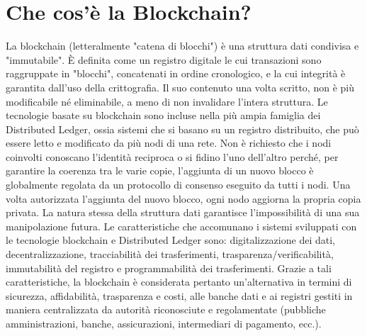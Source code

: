 \section{Che cos'è la Blockchain?}
La blockchain \cite{blockchain} (letteralmente "catena di blocchi") è una struttura dati condivisa e "immutabile". È definita come un registro digitale le cui transazioni sono raggruppate in "blocchi", concatenati in ordine cronologico, e la cui integrità è garantita dall'uso della crittografia. Il suo contenuto una volta scritto, non è più modificabile né eliminabile, a meno di non invalidare l'intera struttura. Le tecnologie basate su blockchain sono incluse nella più ampia famiglia dei Distributed Ledger, ossia sistemi che si basano su un registro distribuito, che può essere letto e modificato da più nodi di una rete. Non è richiesto che i nodi coinvolti conoscano l'identità reciproca o si fidino l'uno dell'altro perché, per garantire la coerenza tra le varie copie, l'aggiunta di un nuovo blocco è globalmente regolata da un protocollo di consenso eseguito da tutti i nodi. Una volta autorizzata l'aggiunta del nuovo blocco, ogni nodo aggiorna la propria copia privata. La natura stessa della struttura dati garantisce l'impossibilità di una sua manipolazione futura. Le caratteristiche che accomunano i sistemi sviluppati con le tecnologie blockchain e Distributed Ledger sono: digitalizzazione dei dati, decentralizzazione, tracciabilità dei trasferimenti, trasparenza/verificabilità, immutabilità del registro e programmabilità dei trasferimenti. Grazie a tali caratteristiche, la blockchain è considerata pertanto un'alternativa in termini di sicurezza, affidabilità, trasparenza e costi, alle banche dati e ai registri gestiti in maniera centralizzata da autorità riconosciute e regolamentate (pubbliche amministrazioni, banche, assicurazioni, intermediari di pagamento, ecc.).


